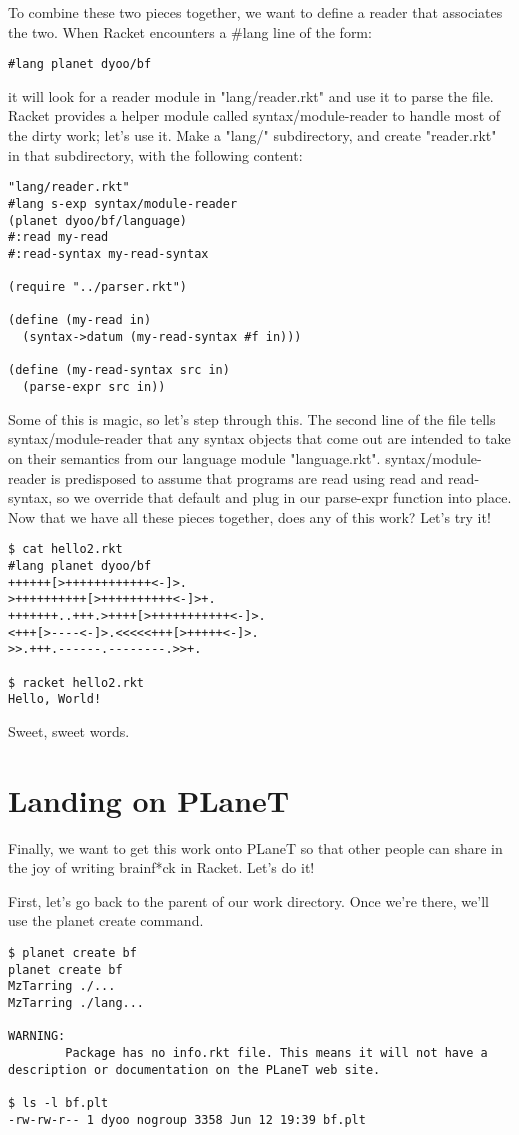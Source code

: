 \documentclass{article}
\begin{document}
To combine these two pieces together, we want to define a reader that associates the two. When Racket encounters a #lang line of the form:
\begin{verbatim}
#lang planet dyoo/bf
\end{verbatim}
it will look for a reader module in "lang/reader.rkt" and use it to parse the file.
Racket provides a helper module called syntax/module-reader to handle most of the dirty work; let’s use it. Make a "lang/" subdirectory, and create "reader.rkt" in that subdirectory, with the following content:
\begin{verbatim}
"lang/reader.rkt"
#lang s-exp syntax/module-reader
(planet dyoo/bf/language)
#:read my-read
#:read-syntax my-read-syntax
 
(require "../parser.rkt")
 
(define (my-read in)
  (syntax->datum (my-read-syntax #f in)))
 
(define (my-read-syntax src in)
  (parse-expr src in))
\end{verbatim}
Some of this is magic, so let’s step through this. The second line of the file tells syntax/module-reader that any syntax objects that come out are intended to take on their semantics from our language module "language.rkt". syntax/module-reader is predisposed to assume that programs are read using read and read-syntax, so we override that default and plug in our parse-expr function into place.
Now that we have all these pieces together, does any of this work? Let’s try it!
\begin{verbatim}
$ cat hello2.rkt
#lang planet dyoo/bf
++++++[>++++++++++++<-]>.
>++++++++++[>++++++++++<-]>+.
+++++++..+++.>++++[>+++++++++++<-]>.
<+++[>----<-]>.<<<<<+++[>+++++<-]>.
>>.+++.------.--------.>>+.
 
$ racket hello2.rkt
Hello, World!
\end{verbatim}
Sweet, sweet words.

\section{Landing on PLaneT}
Finally, we want to get this work onto PLaneT so that other people can share in the joy of writing brainf*ck in Racket. Let’s do it!

First, let’s go back to the parent of our work directory. Once we’re there, we’ll use the planet create command.
\begin{verbatim}
$ planet create bf
planet create bf
MzTarring ./...
MzTarring ./lang...
 
WARNING:
        Package has no info.rkt file. This means it will not have a description or documentation on the PLaneT web site.
 
$ ls -l bf.plt
-rw-rw-r-- 1 dyoo nogroup 3358 Jun 12 19:39 bf.plt
\end{verbatim}
\end{document}
